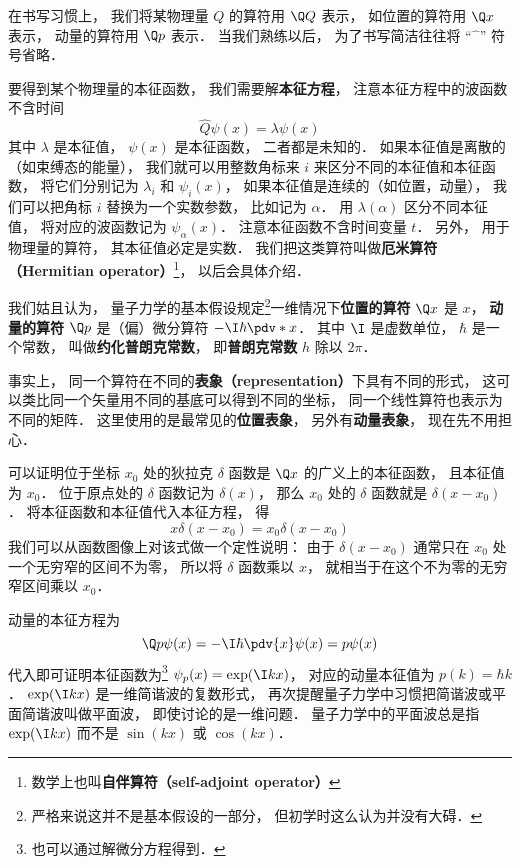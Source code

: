 在书写习惯上， 我们将某物理量 $Q$ 的算符用 $\Q Q$ 表示， 如位置的算符用 $\Q x$ 表示， 动量的算符用 $\Q p$ 表示． 当我们熟练以后， 为了书写简洁往往将 “$\hat{\phantom{x}}$” 符号省略．

要得到某个物理量的本征函数， 我们需要解\textbf{本征方程}， 注意本征方程中的波函数不含时间
\begin{equation}
\hat Q \psi(x) = \lambda \psi(x)
\end{equation}
其中 $\lambda$ 是本征值， $\psi(x)$ 是本征函数， 二者都是未知的． 如果本征值是离散的（如束缚态的能量）， 我们就可以用整数角标来 $i$ 来区分不同的本征值和本征函数， 将它们分别记为 $\lambda_i$ 和 $\psi_i(x)$， 如果本征值是连续的（如位置，动量）， 我们可以把角标 $i$ 替换为一个实数参数， 比如记为 $\alpha$． 用 $\lambda(\alpha)$ 区分不同本征值， 将对应的波函数记为 $\psi_\alpha(x)$． 注意本征函数不含时间变量 $t$． 另外， 用于物理量的算符， 其本征值必定是实数． 我们把这类算符叫做\textbf{厄米算符（Hermitian operator）}\footnote{数学上也叫\textbf{自伴算符（self-adjoint operator）}}， 以后会具体介绍．

我们姑且认为， 量子力学的基本假设规定\footnote{严格来说这并不是基本假设的一部分， 但初学时这么认为并没有大碍．}一维情况下\textbf{位置的算符} $\Q x$ 是 $x$， \textbf{动量的算符} $\Q p$ 是（偏）微分算符 $-\I\hbar \pdv*{x}$． 其中 $\I$ 是虚数单位， $\hbar$ 是一个常数， 叫做\textbf{约化普朗克常数}， 即\textbf{普朗克常数} $h$ 除以 $2\pi$．

事实上， 同一个算符在不同的\textbf{表象（representation）}下具有不同的形式， 这可以类比同一个矢量用不同的基底可以得到不同的坐标， 同一个线性算符也表示为不同的矩阵．%
这里使用的是最常见的\textbf{位置表象}， 另外有\textbf{动量表象}， 现在先不用担心．

可以证明位于坐标 $x_0$ 处的狄拉克 $\delta$ 函数是 $\Q x$ 的广义上的本征函数， 且本征值为 $x_0$． 位于原点处的 $\delta$ 函数记为 $\delta(x)$， 那么 $x_0$ 处的 $\delta$ 函数就是 $\delta (x - x_0)$． 将本征函数和本征值代入本征方程， 得
\begin{equation}
x \delta(x - x_0) = x_0 \delta(x - x_0)
\end{equation}
我们可以从函数图像上对该式做一个定性说明： 由于 $\delta(x - x_0)$ 通常只在 $x_0$ 处一个无穷窄的区间不为零， 所以将 $\delta$ 函数乘以 $x$， 就相当于在这个不为零的无穷窄区间乘以 $x_0$．

动量的本征方程为
\begin{equation}
\Q p \psi(x) = -\I\hbar \pdv{x} \psi(x) = p \psi(x)
\end{equation}
代入即可证明本征函数为\footnote{也可以通过解微分方程得到．} $\psi_p(x) = \exp(\I k x)$， 对应的动量本征值为 $p(k) = \hbar k$． $\exp(\I k x)$ 是一维简谐波的复数形式， 再次提醒量子力学中习惯把简谐波或平面简谐波叫做平面波， 即使讨论的是一维问题． 量子力学中的平面波总是指 $\exp(\I k x)$ 而不是 $\sin(kx)$ 或 $\cos(kx)$．

